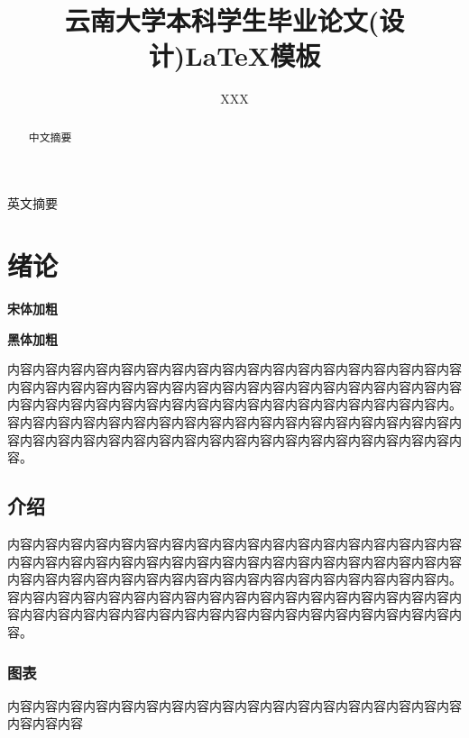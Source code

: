 \documentclass{YNUbachelor}
\title{云南大学本科学生毕业论文(设计)\;\LaTeX 模板}
\author{XXX}
\begin{document}
	
	\cover

	\copyrightpage
	
	\maketitle

	\toc

	\begin{abstract}
		中文摘要
	\end{abstract}


	\begin{enabstract}
		英文摘要
	\end{enabstract}

		
	\section{绪论}
		{\bfseries \songti 宋体加粗}
		
		{\bfseries \heiti 黑体加粗}
		
		内容内容内容内容内容内容内容内容内容内容内容内容内容内容内容内容内容内容内容内容内容内容内容内容内容内容内容内容内容内容内容内容内容内容内容内容内容内容内容内容内容内容内容内容内容内容内容内容内容内容内容内容内容内。容内容内容内容内容内容内容内容内容内容内容内容内容内容内容内容内容内容内容内容内容内容内容内容内容内容内容内容内容内容内容内容内容内容内容内容内容。
		
	\subsection{介绍}
		内容内容内容内容内容内容内容内容内容内容内容内容内容内容内容内容内容内容内容内容内容内容内容内容内容内容内容内容内容内容内容内容内容内容内容内容内容内容内容内容内容内容内容内容内容内容内容内容内容内容内容内容内容内。容内容内容内容内容内容内容内容内容内容内容内容内容内容内容内容内容内容内容内容内容内容内容内容内容内容内容内容内容内容内容内容内容内容内容内容内容。
		
	\subsubsection{图表}
		内容内容内容内容内容内容内容内容内容内容内容内容内容内容内容内容内容内容内容内容内容
		
		
		
\end{document}
